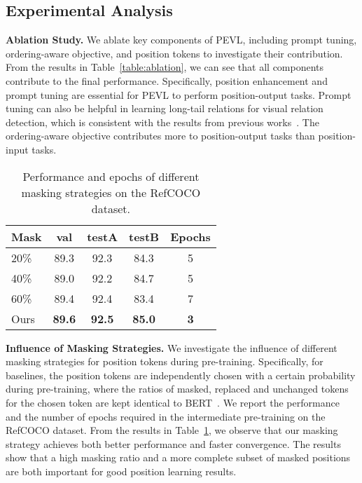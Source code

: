 \documentclass[11pt]{article}
\begin{document}
\subsection{Experimental Analysis}
\label{sec:analysis}

\smallskip
\textbf{Ablation Study.} We ablate key components of PEVL, including prompt tuning, ordering-aware objective, and position tokens to investigate their contribution. From the results in Table~\ref{table:ablation}, we can see that all components contribute to the final performance. Specifically, position enhancement and prompt tuning are essential for PEVL to perform position-output tasks. Prompt tuning can also be helpful in learning long-tail relations for visual relation detection, which is consistent with the results from previous works~\cite{yao2021cpt}. The ordering-aware objective contributes more to position-output tasks than position-input tasks.







\begin{table}[!t]
\centering


\small
\begin{tabular}{l | cc c |c}
\toprule
Mask & val & testA & testB  & Epochs  \\ 
\midrule
20\% & 89.3 & 92.3 &  84.3  & 5 \\
40\% & 89.0 & 92.2 &  84.7  & 5 \\
60\% & 89.4 & 92.4 &  83.4  & 7 \\
Ours & \textbf{89.6} & \textbf{92.5} &  \textbf{85.0}  & \textbf{3} \\
\bottomrule
\end{tabular}
\caption{Performance and epochs of different masking strategies on the RefCOCO dataset.}
\label{tab:mask ratio}
\end{table}

\smallskip
\textbf{Influence of Masking Strategies.} We investigate the influence of different masking strategies for position tokens during pre-training. Specifically, for baselines, the position tokens are independently chosen with a certain probability during pre-training, where the ratios of masked, replaced and unchanged tokens for the chosen token are kept identical to BERT~\cite{devlin2019bert}. We report the performance and the number of epochs required in the intermediate pre-training on the RefCOCO dataset. From the results in Table~\ref{tab:mask ratio}, we observe that our masking strategy achieves both better performance and faster convergence. The results show that a high masking ratio and a more complete subset of masked positions are both important for good position learning results.
\end{document}
